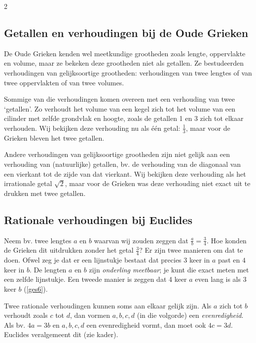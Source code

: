 \begin{multicols}{2}
	\subsection*{Getallen en verhoudingen bij de Oude Grieken}
	
	De Oude Grieken kenden wel meetkundige grootheden zoals lengte, oppervlakte en volume, maar ze bekeken deze grootheden niet als getallen. Ze bestudeerden verhoudingen van gelijksoortige grootheden: verhoudingen van twee lengtes of van twee oppervlakten of van twee volumes. 
	
	Sommige van die verhoudingen komen overeen met een verhouding van twee `getallen'. Zo verhoudt het volume van een kegel zich tot het volume van een cilinder met zelfde grondvlak en hoogte, zoals de getallen 1 en 3 zich tot elkaar verhouden. Wij bekijken deze verhouding nu als één getal: $\frac{1}{3}$, maar voor de Grieken bleven het twee getallen.
	
	Andere verhoudingen van gelijksoortige grootheden zijn niet gelijk aan een verhouding van (natuurlijke) getallen, bv. de verhouding van de diagonaal van een vierkant tot de zijde van dat vierkant. Wij bekijken deze verhouding als het irrationale getal $\sqrt{2}$, maar voor de Grieken was deze verhouding niet exact uit te drukken met twee getallen.
	
	\subsection*{Rationale verhoudingen bij Euclides}
	
	
	Neem bv. twee lengtes $a$ en $b$ waarvan wij zouden zeggen dat $\frac{a}{b}=\frac{3}{4}$. Hoe konden de Grieken dit uitdrukken zonder het getal $\frac{3}{4}$?
	Er zijn twee manieren om dat te doen. Ofwel zeg je dat er een lijnstukje bestaat dat precies $3$ keer in $a$ past en $4$ keer in $b$. De lengten $a$  en $b$ zijn \emph{onderling meetbaar}; je kunt die exact meten met een zelfde lijnstukje. Een tweede manier is zeggen dat 4 keer $a$ even lang is als 3 keer $b$ (\autoref{ges6}).
	
	
	Twee rationale verhoudingen kunnen soms aan elkaar gelijk zijn. Als $a$ zich tot $b$ verhoudt zoals $c$ tot $d$, dan vormen $a, b, c, d$ (in die volgorde) een \emph{evenredigheid}. Als bv. $4a=3b$ en $a, b, c, d$ een evenredigheid vormt, dan moet ook $4c=3d$. Euclides veralgemeent dit (zie kader).
	

\end{multicols}
